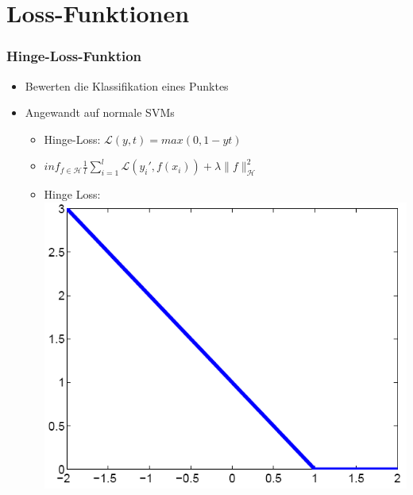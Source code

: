 \documentclass{beamer}
\begin{document}
\section{Loss-Funktionen}

\begin{frame}
\frametitle{Hinge-Loss-Funktion}
    \begin{itemize}
        \item Bewerten die Klassifikation eines Punktes
        \item Angewandt auf normale SVMs
        \begin{itemize}
            \item Hinge-Loss: $\mathcal{L}(y, t) = max(0, 1 − yt)$
            \item $inf_{f \in \mathcal{H}} \frac{1}{l} \sum_{i=1}^l \mathcal{L} (y_i', f(x_i)) + \lambda \|f\|^2_\mathcal{H}$
            \item Hinge Loss: \includegraphics[scale=0.2]{img/hinge_loss_function.png}
        \end{itemize}	
    \end{itemize}
\end{frame}
\end{document}
